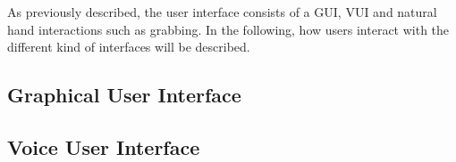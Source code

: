 As previously described, the user interface consists of a GUI, VUI and natural hand interactions such as grabbing.
In the following, how users interact with the different kind of interfaces will be described. 

\subsection{\label{sec::GraphicalUserInterface}Graphical User Interface}

\subsection{\label{sec::VoiceUserInterface}Voice User Interface}

